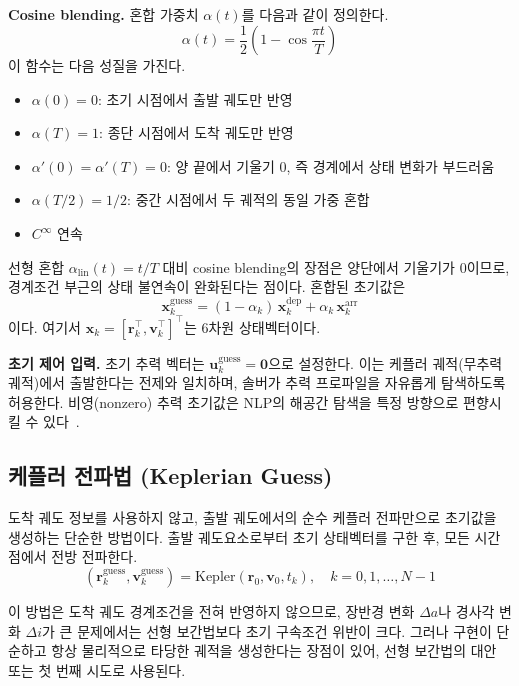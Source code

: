 \documentclass[11pt]{article}
\begin{document}
\textbf{Cosine blending.}
혼합 가중치 $\alpha(t)$를 다음과 같이 정의한다.
\begin{equation}
\alpha(t) = \frac{1}{2}\left(1 - \cos\frac{\pi t}{T}\right)
\label{eq:cosine_blending}
\end{equation}
이 함수는 다음 성질을 가진다.
\begin{itemize}[nosep]
  \item $\alpha(0) = 0$: 초기 시점에서 출발 궤도만 반영
  \item $\alpha(T) = 1$: 종단 시점에서 도착 궤도만 반영
  \item $\alpha'(0) = \alpha'(T) = 0$: 양 끝에서 기울기 0, 즉 경계에서 상태 변화가 부드러움
  \item $\alpha(T/2) = 1/2$: 중간 시점에서 두 궤적의 동일 가중 혼합
  \item $C^{\infty}$ 연속
\end{itemize}

선형 혼합 $\alpha_{\text{lin}}(t) = t/T$ 대비 cosine blending의 장점은 양단에서 기울기가 0이므로,
경계조건 부근의 상태 불연속이 완화된다는 점이다. 혼합된 초기값은
\[
\mathbf{x}_k^{\text{guess}} = (1 - \alpha_k)\,\mathbf{x}_k^{\text{dep}} + \alpha_k\,\mathbf{x}_k^{\text{arr}}
\]
이다. 여기서 $\mathbf{x}_k = [\mathbf{r}_k^{\top}, \mathbf{v}_k^{\top}]^{\top}$는 6차원 상태벡터이다.

\textbf{초기 제어 입력.}
초기 추력 벡터는 $\mathbf{u}_k^{\text{guess}} = \mathbf{0}$으로 설정한다.
이는 케플러 궤적(무추력 궤적)에서 출발한다는 전제와 일치하며, 솔버가 추력 프로파일을 자유롭게 탐색하도록 허용한다.
비영(nonzero) 추력 초기값은 NLP의 해공간 탐색을 특정 방향으로 편향시킬 수 있다~\cite{Betts2010}.


\subsection{케플러 전파법 (Keplerian Guess)}
\label{sec:keplerian_guess}

도착 궤도 정보를 사용하지 않고, 출발 궤도에서의 순수 케플러 전파만으로 초기값을 생성하는 단순한 방법이다.
출발 궤도요소로부터 초기 상태벡터를 구한 후, 모든 시간점에서 전방 전파한다.
\[
(\mathbf{r}_k^{\text{guess}}, \mathbf{v}_k^{\text{guess}}) = \text{Kepler}(\mathbf{r}_0, \mathbf{v}_0, t_k), \quad k = 0, 1, \ldots, N-1
\]

이 방법은 도착 궤도 경계조건을 전혀 반영하지 않으므로, 장반경 변화 $\Delta a$나 경사각 변화 $\Delta i$가 큰 문제에서는
선형 보간법보다 초기 구속조건 위반이 크다.
그러나 구현이 단순하고 항상 물리적으로 타당한 궤적을 생성한다는 장점이 있어,
선형 보간법의 대안 또는 첫 번째 시도로 사용된다.
\end{document}
